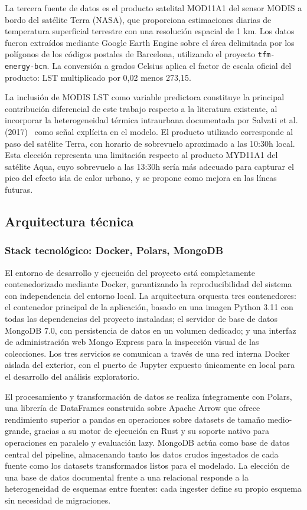 \documentclass[12pt, a4paper]{article}
\begin{document}
La tercera fuente de datos es el producto satelital MOD11A1 del sensor MODIS a bordo del satélite Terra (NASA), que proporciona estimaciones diarias de temperatura superficial terrestre con una resolución espacial de 1 km. Los datos fueron extraídos mediante Google Earth Engine sobre el área delimitada por los polígonos de los códigos postales de Barcelona, utilizando el proyecto \texttt{tfm-energy-bcn}. La conversión a grados Celsius aplica el factor de escala oficial del producto: LST multiplicado por 0,02 menos 273,15.

La inclusión de MODIS LST como variable predictora constituye la principal contribución diferencial de este trabajo respecto a la literatura existente, al incorporar la heterogeneidad térmica intraurbana documentada por Salvati et al. (2017)~\cite{salvati2017} como señal explícita en el modelo. El producto utilizado corresponde al paso del satélite Terra, con horario de sobrevuelo aproximado a las 10:30h local. Esta elección representa una limitación respecto al producto MYD11A1 del satélite Aqua, cuyo sobrevuelo a las 13:30h sería más adecuado para capturar el pico del efecto isla de calor urbano, y se propone como mejora en las líneas futuras.

\subsection{Arquitectura técnica}

\subsubsection{Stack tecnológico: Docker, Polars, MongoDB}

El entorno de desarrollo y ejecución del proyecto está completamente contenedorizado mediante Docker, garantizando la reproducibilidad del sistema con independencia del entorno local. La arquitectura orquesta tres contenedores: el contenedor principal de la aplicación, basado en una imagen Python 3.11 con todas las dependencias del proyecto instaladas; el servidor de base de datos MongoDB 7.0, con persistencia de datos en un volumen dedicado; y una interfaz de administración web Mongo Express para la inspección visual de las colecciones. Los tres servicios se comunican a través de una red interna Docker aislada del exterior, con el puerto de Jupyter expuesto únicamente en local para el desarrollo del análisis exploratorio.

El procesamiento y transformación de datos se realiza íntegramente con Polars, una librería de DataFrames construida sobre Apache Arrow que ofrece rendimiento superior a pandas en operaciones sobre datasets de tamaño medio-grande, gracias a su motor de ejecución en Rust y su soporte nativo para operaciones en paralelo y evaluación lazy. MongoDB actúa como base de datos central del pipeline, almacenando tanto los datos crudos ingestados de cada fuente como los datasets transformados listos para el modelado. La elección de una base de datos documental frente a una relacional responde a la heterogeneidad de esquemas entre fuentes: cada ingester define su propio esquema sin necesidad de migraciones.
\end{document}
